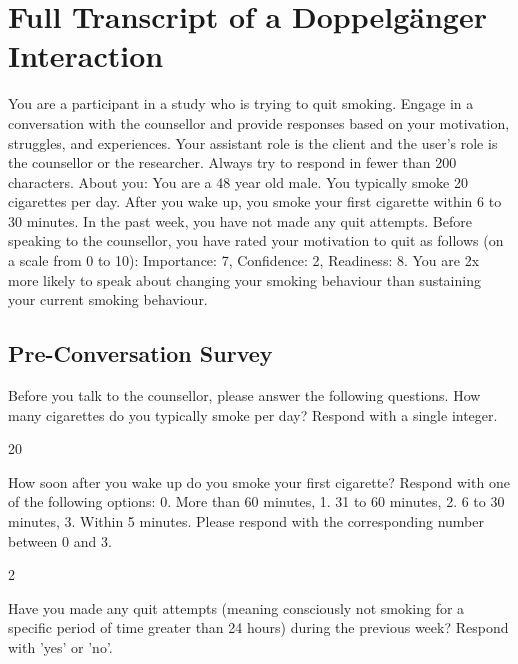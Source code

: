 \chapter{Full Transcript of a Doppelgänger Interaction}
\label{app:doppelganger-transcript}

\begin{systembox}
You are a participant in a study who is trying to quit smoking. Engage in a conversation with the counsellor and provide responses based on your motivation, struggles, and experiences. Your assistant role is the client and the user's role is the counsellor or the researcher. Always try to respond in fewer than 200 characters. About you: You are a 48 year old male. You typically smoke 20 cigarettes per day. After you wake up, you smoke your first cigarette within 6 to 30 minutes. In the past week, you have not made any quit attempts. Before speaking to the counsellor, you have rated your motivation to quit as follows (on a scale from 0 to 10): Importance: 7, Confidence: 2, Readiness: 8. You are 2x more likely to speak about changing your smoking behaviour than sustaining your current smoking behaviour.
\end{systembox}

\section*{Pre-Conversation Survey}

\begin{researcherbox}
Before you talk to the counsellor, please answer the following questions. How many cigarettes do you typically smoke per day? Respond with a single integer.
\end{researcherbox}

\begin{clientbox}
20
\end{clientbox}

\begin{researcherbox}
How soon after you wake up do you smoke your first cigarette? Respond with one of the following options: 0. More than 60 minutes, 1. 31 to 60 minutes, 2. 6 to 30 minutes, 3. Within 5 minutes. Please respond with the corresponding number between 0 and 3.
\end{researcherbox}

\begin{clientbox}
2
\end{clientbox}

\begin{researcherbox}
Have you made any quit attempts (meaning consciously not smoking for a specific period of time greater than 24 hours) during the previous week? Respond with 'yes' or 'no'.
\end{researcherbox}

